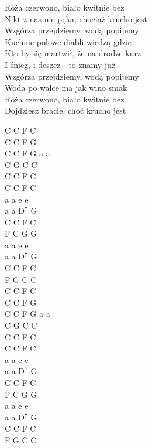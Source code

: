 \documentclass[a5paper, 10pt]{book}
\begin{document}
\begin{minipage}[t]{0.7\textwidth}
\hspace*{5mm}Róża czerwono, biało kwitnie bez\\
\hspace*{5mm}Nikt z nas nie pęka, chociaż krucho jest\\
\hspace*{5mm}Wzgórza przejdziemy, wodą popijemy\\
\hspace*{5mm}Kuchnie polowe diabli wiedzą gdzie\\
\hspace*{5mm}Kto by się martwił, że na drodze kurz\\
\hspace*{5mm}I śnieg, i deszcz - to znamy już\\
\hspace*{5mm}Wzgórza przejdziemy, wodą popijemy\\
\hspace*{5mm}Woda po walce ma jak wino smak\\
\hspace*{5mm}Róża czerwono, biało kwitnie bez\\
\hspace*{5mm}Dojdziesz bracie, choć krucho jest\\
\end{minipage}
\begin{minipage}[t]{0.3\textwidth}
C C F C\\
C C F G\\
C C F G a a\\
C G C C\\

C C F C\\
C C F C\\
a a e e\\
a a D$^7$ G\\
C C F C\\
F C G G\\
a a e e\\
a a D$^7$ G\\
C C F C\\
F G C C\\

C C F C\\
C C F G\\
C C F G a a\\
C G C C\\

C C F C\\
C C F C\\
a a e e\\
a a D$^7$ G\\
C C F C\\
F C G G\\
a a e e\\
a a D$^7$ G\\
C C F C\\
F G C C\\

\end{minipage}
\end{document}
